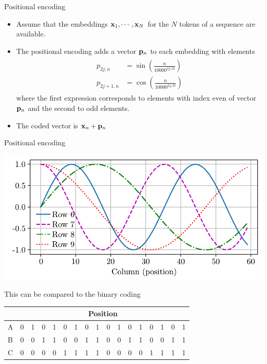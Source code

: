\documentclass{beamer}
\begin{document}
\begin{frame}{Positional encoding}
\begin{itemize}
\item Assume that the embeddings ${\bf x}_1, \cdots, {\bf x}_N$ for the $N$ tokens of a sequence are available.  
\item The positional encoding adds a vector ${\bf p}_n$ to each embedding with elements
\begin{equation}
    \begin{split}\begin{aligned} p_{2j,n} &= \sin\left(\frac{n}{10000^{2j/D}}\right)\\p_{2j+1,n} &= \cos\left(\frac{n}{10000^{2j/D}}\right)\end{aligned}\end{split}
    \end{equation}
where the first expression corresponds to elements with index even of vector ${\bf p}_n$ and the second to odd elements.
\item The coded vector is ${\bf x}_n + {\bf p}_n$
\end{itemize} 
\end{frame}
\begin{frame}{Positional encoding}
\begin{center}
\includegraphics[scale=0.5]{Module 6 (Attention-based networks)/pics/output_self-attention-and-positional-encoding.pdf}
 \end{center}   
 This can be compared to the binary coding
\begin{table}[]
\begin{tabular}{|l|llllllllllllllll|}
\hline
&\multicolumn{16}{|c|}{Position}                                     \\
\hline
A & 0 & 1 & 0 & 1 & 0 & 1 & 0 & 1 & 0 & 1 & 0 & 1 & 0 & 1 & 0 & 1 \\
B & 0 & 0 & 1 & 1 & 0 & 0 & 1 & 1 & 0 & 0 & 1 & 1 & 0 & 0 & 1 & 1 \\
C & 0 & 0 & 0 & 0 & 1 & 1 & 1 & 1 & 0 & 0 & 0 & 0 & 1 & 1 & 1 & 1\\
\hline
\end{tabular}
\end{table}
\end{frame}
\end{document}
